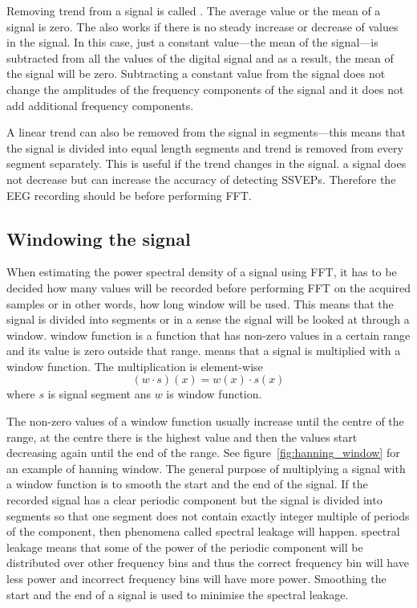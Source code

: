 Removing \gls{trend} from a signal is called . The average value or the \gls{mean} of a  signal is zero. The  also works if there is no steady increase or decrease of values in the signal. In this case, just a constant value---the \gls{mean} of the signal---is subtracted from all the values of the \gls{digital signal} and as a result, the \gls{mean} of the signal will be zero. Subtracting a constant value from the signal does not change the amplitudes of the \glspl{frequency component} of the signal and it does not add additional \glspl{frequency component}.

A linear \gls{trend} can also be removed from the signal in segments---this means that the signal is divided into equal length segments and \gls{trend} is removed from every segment separately. This is useful if the \gls{trend} changes in the signal.  a signal does not decrease but can increase the accuracy of detecting \glspl{SSVEP}. Therefore the \gls{EEG} recording should be  before performing \gls{FFT}.

\subsection{Windowing the signal}

When estimating the \gls{power spectral density} of a signal using \gls{FFT}, it has to be decided how many values will be recorded before performing \gls{FFT} on the acquired samples or in other words, how long \gls{window} will be used. This means that the signal is divided into segments or in a sense the signal will be looked at through a window. \Gls{window} function is a function that has non-zero values in a certain range and its value is zero outside that range.  means that a signal is multiplied with a \gls{window} function. The multiplication is element-wise
\begin{equation}
	(w\cdot s)(x)=w(x)\cdot s(x)
\end{equation}
where $s$ is signal segment ans $w$ is \gls{window} function.

The non-zero values of a \gls{window} function usually increase until the centre of the range, at the centre there is the highest value and then the values start decreasing again until the end of the range. See figure~\ref{fig:hanning_window} for an example of hanning \gls{window}. The general purpose of multiplying a signal with a \gls{window} function is to smooth the start and the end of the signal. If the recorded signal has a clear periodic component but the signal is divided into segments so that one segment does not contain exactly integer multiple of periods of the component, then phenomena called \gls{spectral leakage} will happen. \Gls{spectral leakage} means that some of the power of the periodic component will be distributed over other \glspl{frequency bin} and thus the correct \gls{frequency bin} will have less power and incorrect \glspl{frequency bin} will have more power. Smoothing the start and the end of a signal is used to minimise the \gls{spectral leakage}.

